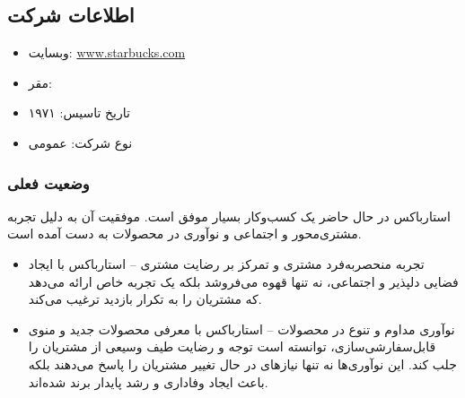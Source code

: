 \documentclass[dvipsnames, svgnames, x11names, 11pt, twocolumn]{article}
\begin{document}
\subsection{اطلاعات شرکت}
\begin{itemize}
\item 
وبسایت:
\url{www.starbucks.com}

\item 
مقر:

\item 
تاریخ تاسیس: ۱۹۷۱

\item 
نوع شرکت: عمومی
\end{itemize}
\subsubsection{وضعیت فعلی}

استارباکس در حال حاضر یک کسب‌وکار بسیار موفق است. موفقیت آن به دلیل تجربه مشتری‌محور و اجتماعی و نوآوری در محصولات به دست آمده است.

\begin{itemize}
\item
 تجربه منحصربه‌فرد مشتری و تمرکز بر رضایت مشتری – استارباکس با ایجاد فضایی دلپذیر و اجتماعی، نه تنها قهوه می‌فروشد بلکه یک تجربه خاص ارائه می‌دهد که مشتریان را به تکرار بازدید ترغیب می‌کند.

\item 
نوآوری مداوم و تنوع در محصولات – استارباکس با معرفی محصولات جدید و منوی قابل‌سفارشی‌سازی، توانسته است توجه و رضایت طیف وسیعی از مشتریان را جلب کند. این نوآوری‌ها نه تنها نیازهای در حال تغییر مشتریان را پاسخ می‌دهند بلکه باعث ایجاد وفاداری و رشد پایدار برند شده‌اند.
\end{itemize}
\end{document}
